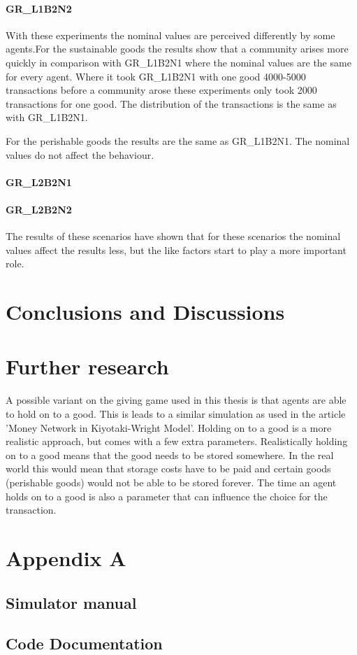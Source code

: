 \documentclass[twoside,openright]{uva-bachelor-thesis}
\begin{document}
\subsubsection{GR\_L1B2N2}
With these experiments the nominal values are perceived differently by some agents.For the sustainable goods the results show that a community arises more quickly in comparison with GR\_L1B2N1 where the nominal values are the same for every agent. Where it took GR\_L1B2N1 with one good 4000-5000 transactions before a community arose these experiments only took 2000 transactions for one good. The distribution of the transactions is the same as with GR\_L1B2N1. 

For the perishable goods the results are the same as GR\_L1B2N1. The nominal values do not affect the behaviour.
\subsubsection{GR\_L2B2N1}
\subsubsection{GR\_L2B2N2}

The results of these scenarios have shown that for these scenarios the nominal values affect the results less, but the like factors start to play a more important role.

\chapter{Conclusions and Discussions}

\chapter{Further research}
A possible variant on the giving game used in this thesis is that agents are able to hold on to a good. This is leads to a similar simulation as used in the article 'Money Network in Kiyotaki-Wright Model'. Holding on to a good is a more realistic approach, but comes with a few extra parameters. Realistically holding on to a good means that the good needs to be stored somewhere. In the real world this would mean that storage costs have to be paid and certain goods (perishable goods) would not be able to be stored forever. The time an agent holds on to a good is also a parameter that can influence the choice for the transaction.

\chapter{Appendix A}

\section{Simulator manual}

\section{Code Documentation}
\end{document}
